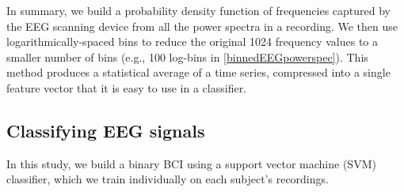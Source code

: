 
In summary, we build a probability density function of frequencies captured by the EEG scanning device from all the power spectra in a recording. We then use logarithmically-spaced bins to reduce the original 1024 frequency values to a smaller number of bins (e.g., 100 log-bins in \ref{binnedEEGpowerspec}). This method produces a statistical average of a time series, compressed into a single feature vector that it is easy to use in a classifier.







\subsection{Classifying EEG signals}


In this study, we build a binary BCI using a support vector machine (SVM) classifier, which we train individually on each subject's recordings. 

